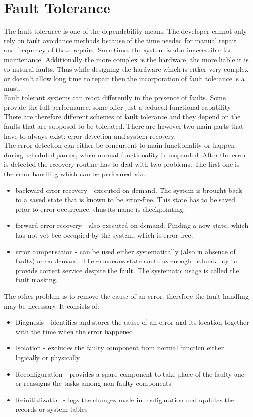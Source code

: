 \section{Fault Tolerance}\label{sec:tolerance}
The fault tolerance is one of the dependability means. The developer cannot only rely on fault avoidance methods because of the time needed for manual repair and frequency of those repairs. Sometimes the system is also inaccessible for maintenance. Additionally the more complex is the hardware, the more liable it is to natural faults. Thus while designing the hardware which is either very complex or doesn't allow long time to repair then the incorporation of fault tolerance is a must.\\
Fault tolerant systems can react differently in the presence of faults. Some provide the full performance, some offer just a reduced functional capability~\cite{art:Randell}. There are therefore different schemes of fault tolerance and they depend on the faults that are supposed to be tolerated. There are however two main parts that have to always exist: error detection and system recovery.\\
The error detection can either be concurrent to main functionality or happen during scheduled pauses, when normal functionality is suspended. After the error is detected the recovery routine has to deal with two problems. The first one is the error handling which can be performed via:
\begin{itemize}
    \item backward error recovery - executed on demand. The system is brought back to a saved state that is known to be error-free. This state has to be saved prior to error occurrence, thus its name is checkpointing.
    \item forward error recovery - also executed on demand. Finding a new state, which has not yet bee occupied by the system, which is error-free.
    \item error compensation - can be used either systematically (also in absence of faults) or on demand. The erroneous state contains enough redundancy to provide correct service despite the fault. The systematic usage is called the fault masking.
\end{itemize} 
The other problem is to remove the cause of an error, therefore the fault handling may be necessary. It consists of:
\begin{itemize}
    \item Diagnosis - identifies and stores the cause of an error and its location together with the time when the error happened.
    \item Isolation - excludes the faulty component from normal function either logically or physically 
    \item Reconfiguration - provides a spare component to take place of the faulty one or reassigns the tasks among non faulty components
    \item Reinitialization - logs the changes made in configuration and updates the records or system tables 
\end{itemize}
